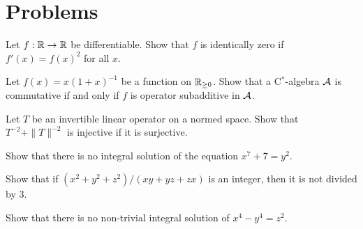 \documentclass[a4paper,12pt]{report}
\begin{document}
\newpage
\section{Problems}

\begin{prb}
Let $f:\mathbb{R}\to\mathbb{R}$ be differentiable.
Show that $f$ is identically zero if $f'(x)=f(x)^2$ for all $x$.
\end{prb}

\begin{prb}
Let $f(x)=x(1+x)^{-1}$ be a function on $\mathbb{R}_{\ge0}$.
Show that a C$^*$-algebra $\mathcal{A}$ is commutative if and only if $f$ is operator subadditive in $\mathcal{A}$.
\end{prb}

\begin{prb}
Let $T$ be an invertible linear operator on a normed space.
Show that $T^{-2}+\|T\|^{-2}$ is injective if it is surjective.
\end{prb}

\begin{prb}
\begin{parts}
\item Show that there is no integral solution of the equation $x^7+7=y^2$.
\item Show that if $(x^2+y^2+z^2)/(xy+yz+zx)$ is an integer, then it is not divided by 3.
\item Show that there is no non-trivial integral solution of $x^4-y^4=z^2$.
\end{parts}
\end{prb}
\end{document}
